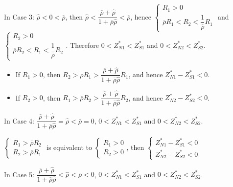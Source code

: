 \documentclass[10pt]{article}
\begin{document}
In Case 3: $ {\hat \rho} < 0 < \overline{\rho} $, then $ {\hat \rho} < \dfrac{\overline{\rho} + {\hat \rho}}{1 + \overline{\rho} {\hat \rho}} < \overline{\rho} $, hence $ \left\{ \begin{matrix} R_1 > 0 \\ \overline{\rho} R_1 < R_2 < \dfrac{1}{\overline{\rho}} R_1 \end{matrix} \right. $ and $ \left\{ \begin{matrix} R_2 > 0 \\ \overline{\rho} R_2 < R_1 < \dfrac{1}{\overline{\rho}} R_2 \end{matrix} \right. $.
Therefore $ 0 < Z_{N 1}^* < Z_{S 1}^* $ and $ 0 < Z_{N 2}^* < Z_{S 2}^* $.
\begin{itemize}
\item If $ R_1 > 0 $, then $ R_2 > \overline{\rho} R_1 > \dfrac{\overline{\rho} + {\hat \rho}}{1 + \overline{\rho} {\hat \rho}} R_1 $, and hence $ Z_{N 1}^* - Z_{S 1}^* < 0 $.
\item If $ R_2 > 0 $, then $ R_1 > \overline{\rho} R_2 > \dfrac{\overline{\rho} + {\hat \rho}}{1 + \overline{\rho} {\hat \rho}} R_2 $, and hence $ Z_{N 2}^* - Z_{S 2}^* < 0 $.
\end{itemize}

In Case 4: $ \dfrac{\overline{\rho} + {\hat \rho}}{1 + \overline{\rho} {\hat \rho}} = {\hat \rho} < \overline{\rho} = 0 $, $ 0 < Z_{N 1}^* < Z_{S 1}^* $ and $ 0 < Z_{N 2}^* < Z_{S 2}^* $.

$ \left\{ \begin{matrix} R_1 > \overline{\rho} R_2 \\ R_2 > \overline{\rho} R_1 \end{matrix} \right. $ is equivalent to $ \left\{ \begin{matrix} R_1 > 0 \\ R_2 > 0 \end{matrix} \right. $, then $ \left\{ \begin{matrix} Z_{N 1}^* - Z_{S 1}^* < 0 \\ Z_{N 2}^* - Z_{S 2}^* < 0 \end{matrix} \right. $

In Case 5: $ \dfrac{\overline{\rho} + {\hat \rho}}{1 + \overline{\rho} {\hat \rho}} < {\hat \rho} < \overline{\rho} < 0 $, $ 0 < Z_{N 1}^* < Z_{S 1}^* $ and $ 0 < Z_{N 2}^* < Z_{S 2}^* $.
\end{document}
